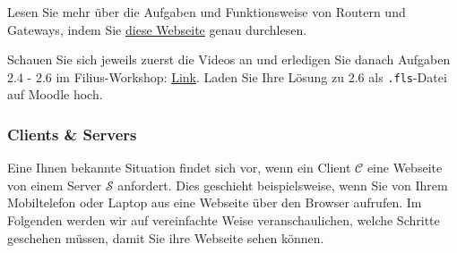 \begin{myexercise}
	Lesen Sie mehr über die Aufgaben und Funktionsweise von Routern und Gateways, indem Sie \href{https://inf-schule.de/rechnernetze/filius/vernetzungrechnernetze/konzept_router}{diese Webseite} genau durchlesen.
\end{myexercise}

\begin{mysubmission}
	Schauen Sie sich jeweils zuerst die Videos an und erledigen Sie danach Aufgaben 2.4 - 2.6 im Filius-Workshop: \href{https://informatik.mygymer.ch/base/?book=network}{Link}. Laden Sie Ihre Lösung zu 2.6 als \texttt{.fls}-Datei auf Moodle hoch.
\end{mysubmission}


\subsubsection{Clients \& Servers}
Eine Ihnen bekannte Situation findet sich vor, wenn ein Client $\mathcal{C}$ eine Webseite von einem Server $\mathcal{S}$ anfordert. Dies geschieht beispielsweise, wenn Sie von Ihrem Mobiltelefon oder Laptop aus eine Webseite über den Browser aufrufen. Im Folgenden werden wir auf vereinfachte Weise veranschaulichen, welche Schritte geschehen müssen, damit Sie ihre Webseite sehen können.


